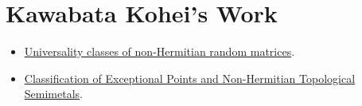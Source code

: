 \documentclass{article}
\begin{document}
\section{Kawabata Kohei's Work}

\begin{itemize}
    \item \href{https://journals.aps.org/prresearch/pdf/10.1103/PhysRevResearch.2.023286}{Universality classes of non-Hermitian random matrices}.
    \item \href{https://arxiv.org/pdf/1902.08479.pdf}{Classification of Exceptional Points and Non-Hermitian Topological Semimetals}.
\end{itemize}

% 
% 
\end{document}

